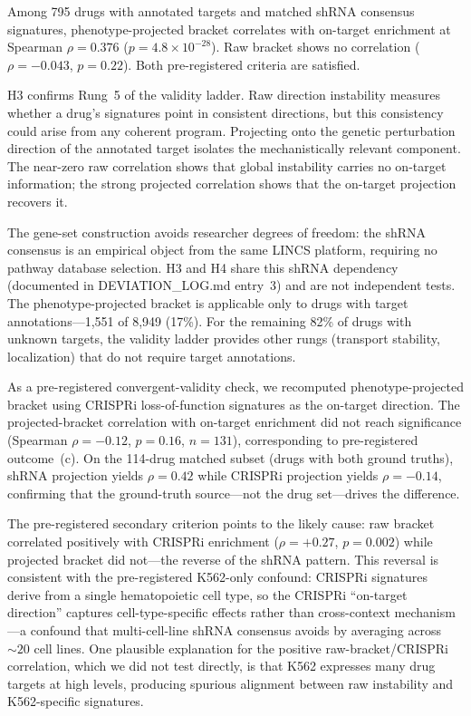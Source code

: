 \documentclass[11pt]{article}
\begin{document}
Among 795 drugs with annotated targets and matched shRNA consensus signatures,
phenotype-projected bracket correlates with on-target enrichment at Spearman
$\rho = 0.376$ ($p = 4.8 \times 10^{-28}$). Raw bracket shows no correlation
($\rho = -0.043$, $p = 0.22$). Both pre-registered criteria are satisfied.

H3 confirms Rung~5 of the validity ladder. Raw direction instability
measures whether a drug's signatures point in consistent directions, but
this consistency could arise from any coherent program. Projecting onto the
genetic perturbation direction of the annotated target isolates the
mechanistically relevant component. The near-zero raw correlation shows
that global instability carries no on-target information; the strong
projected correlation shows that the on-target projection recovers it.

The gene-set construction avoids researcher degrees of freedom: the shRNA
consensus is an empirical object from the same LINCS platform,
requiring no pathway database selection. H3 and H4 share this shRNA
dependency (documented in DEVIATION\_LOG.md entry~3) and are not
independent tests. The phenotype-projected bracket is applicable only
to drugs with target annotations---1{,}551 of 8{,}949 (17\%). For the
remaining 82\% of drugs with unknown targets, the validity ladder
provides other rungs (transport stability, localization) that do not
require target annotations.

As a pre-registered convergent-validity check, we recomputed
phenotype-projected bracket using CRISPRi loss-of-function signatures
\citep{replogle2022mapping} as the on-target
direction. The projected-bracket correlation with on-target enrichment
did not reach significance (Spearman $\rho = -0.12$, $p = 0.16$,
$n = 131$), corresponding to pre-registered outcome~(c). On the
114-drug matched subset (drugs with both ground truths), shRNA
projection yields $\rho = 0.42$ while CRISPRi projection yields
$\rho = -0.14$, confirming that the ground-truth source---not the
drug set---drives the difference.

The pre-registered secondary criterion points to the likely cause: raw
bracket correlated positively with CRISPRi enrichment
($\rho = +0.27$, $p = 0.002$) while projected bracket did not---the
reverse of the shRNA pattern. This reversal is consistent with the
pre-registered K562-only confound: CRISPRi signatures derive from a
single hematopoietic cell type, so the CRISPRi ``on-target direction''
captures cell-type-specific effects rather than cross-context
mechanism---a confound that multi-cell-line shRNA consensus avoids by
averaging across ${\sim}20$ cell lines. One plausible explanation for
the positive raw-bracket/CRISPRi correlation, which we did not test
directly, is that K562 expresses many drug targets at high levels,
producing spurious alignment between raw instability and K562-specific
signatures.
\end{document}
